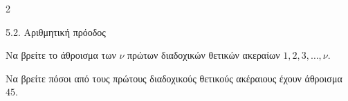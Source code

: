 \begin{ylh}{2}
    \item 5.2. Αριθμητική πρόοδος
\end{ylh}

\begin{alist}
\item Να βρείτε το άθροισμα των $\nu$ πρώτων διαδοχικών θετικών ακεραίων $1, 2, 3, \ldots, \nu$.
\item Να βρείτε πόσοι από τους πρώτους διαδοχικούς θετικούς ακέραιους έχουν άθροισμα $45$.
\end{alist}

